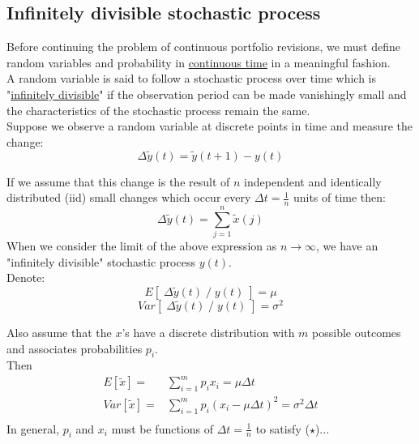\documentclass[
14pt,notheorems,hyperref={pdfauthor=whatever}
]{beamer}
\begin{document}
\subsection{Infinitely divisible stochastic process}
\begin{frame}
Before continuing the problem of continuous portfolio revisions, we must define random variables and probability in \underline{continuous time} in a meaningful fashion.\\
\hfill\break
A random variable is said to follow a stochastic process over time which is "\underline{infinitely divisible}" if the observation period can be made vanishingly small and the characteristics of the stochastic process remain the same.\\
\hfill\break
Suppose we observe a random variable at discrete points in time and measure the change:\\
\[\Delta \tilde y(t) = \tilde y(t+1)-y(t)\]
\end{frame}

\begin{frame}
If we assume that this change is the result of $n$ independent and identically distributed (iid) small changes which occur every $\Delta t = \frac{1}{n}$ units of time then:\\
\[\Delta \tilde y(t) = \sum_{j=1}^n \tilde x(j)\]
When we consider the limit of the above expression as $n\to\infty$, we have an "infinitely divisible" stochastic process $y(t)$.\\
\hfill\break
Denote:\\
\[E[\;\Delta \tilde y(t) \;/\; y(t)\;] = \mu\]
\[Var[\;\Delta \tilde y(t) \;/\; y(t)\;] = \sigma^2\]
\end{frame}

\begin{frame}
Also assume that the $x$'s have a discrete distribution with $m$ possible outcomes and associates probabilities $p_i$.\\
Then\\
\begin{align*}
    E[\tilde x] =& \sum_{i=1}^m p_i x_i = \mu \Delta t\\
    \tag{$\star$}
    Var[\tilde x] =& \sum_{i=1}^m p_i (x_i-\mu \Delta t)^2 = \sigma^2 \Delta t\\
\end{align*}
In general, $p_i$ and $x_i$ must be functions of $\Delta t = \frac{1}{n}$ to satisfy ($\star$)...
\end{frame}
\end{document}
